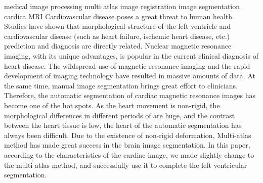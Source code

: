 
\begin{Eabstract}%
{medical image processing}%
{multi atlas}%
{image registration}%
{image segmentation}%
{cardica MRI}
  Cardiovascular disease poses a great threat to human health.
  Studies have shown that morphological structure of the left ventricle
  and cardiovascular disease
  (such as heart failure, ischemic heart disease, etc.)
  prediction and diagnosis are directly related.
  Nuclear magnetic resonance imaging, with its unique advantages,
  is popular in the current clinical diagnosis of heart disease.
  The wildspread use of magnetic resonance imaging
  and the rapid development of imaging technology
  have resulted in massive amounts of data.
  At the same time,
  manual image segmentation brings great effort to clinicians.
  Therefore,
  the automatic segmentation of cardiac magnetic resonance images
  has become one of the hot spots.
  As the heart movement is non-rigid,
  the morphological differences in different periods of are huge,
  and the contrast between the heart tissue is low,
  the heart of the automatic segmentation has always been difficult.
  Due to the existence of non-rigid deformation,
  Multi-atlas method has made great success in the brain image segmentation.
  In this paper, according to the characteristics of the cardiac image,
  we made slightly change to the multi atlas method,
  and successfully use it to complete the left ventricular segmentation.
\end{Eabstract}
